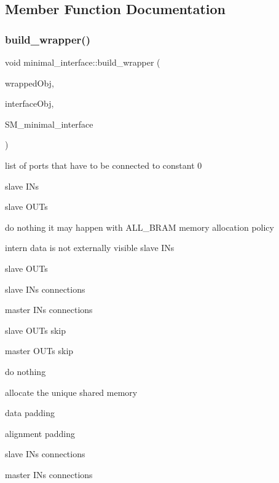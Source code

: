 \subsection{Member Function Documentation}
\mbox{\label{classminimal__interface_adb6448d855a8f541648b22bbffa7993c}} 
\subsubsection{\texorpdfstring{build\+\_\+wrapper()}{build\_wrapper()}}
{\footnotesize\ttfamily void minimal\+\_\+interface\+::build\+\_\+wrapper (\begin{DoxyParamCaption}\item[{\hyperlink{structural__objects_8hpp_a8ea5f8cc50ab8f4c31e2751074ff60b2}{structural\+\_\+object\+Ref}}]{wrapped\+Obj,  }\item[{\hyperlink{structural__objects_8hpp_a8ea5f8cc50ab8f4c31e2751074ff60b2}{structural\+\_\+object\+Ref}}]{interface\+Obj,  }\item[{\hyperlink{structural__manager_8hpp_ab3136f0e785d8535f8d252a7b53db5b5}{structural\+\_\+manager\+Ref}}]{S\+M\+\_\+minimal\+\_\+interface }\end{DoxyParamCaption})}

list of ports that have to be connected to constant 0

slave I\+Ns

slave O\+U\+Ts

do nothing it may happen with A\+L\+L\+\_\+\+B\+R\+AM memory allocation policy

intern data is not externally visible slave I\+Ns

slave O\+U\+Ts

slave I\+Ns connections

master I\+Ns connections

slave O\+U\+Ts skip

master O\+U\+Ts skip

do nothing

allocate the unique shared memory

data padding

alignment padding

slave I\+Ns connections

master I\+Ns connections

